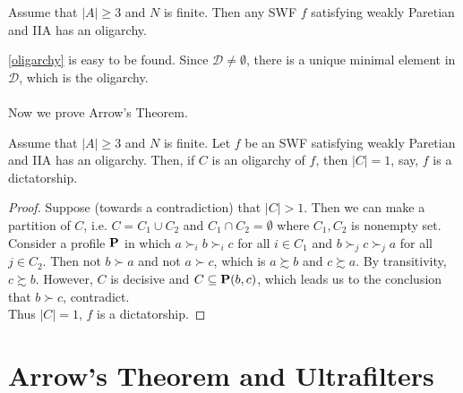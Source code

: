 \begin{theorem}
    \label{oligarchy}
    Assume that $|A| \geq 3$ and $N$ is finite. Then any SWF $f$ satisfying weakly Paretian and IIA has an oligarchy.
\end{theorem}

\cref{oligarchy} is easy to be found. Since $\mathcal{D} \neq \emptyset$, there is a unique minimal element in $\mathcal{D}$, which is the oligarchy. \\
~\\
Now we prove Arrow's Theorem.

\begin{lemma}
    Assume that $|A| \geq 3$ and $N$ is finite. Let $f$ be an SWF satisfying weakly Paretian and IIA has an oligarchy. Then, if $C$ is an oligarchy of $f$, then $|C| = 1$, say, $f$ is a dictatorship. 
\end{lemma}

\begin{proof}
    Suppose (towards a contradiction) that $|C| > 1$. Then we can make a partition of $C$, i.e. $C = C_1 \cup C_2$ and $C_1 \cap C_2 = \emptyset$ where $C_1,C_2$ is nonempty set.\\
    Consider a profile $\mathbf{P}$ in which $a \succ_i b \succ_i c$ for all $i \in C_1$ and $b \succ_j c \succ_j a$ for all $j \in C_2$. Then not $b \succ a$ and not $a \succ c$, which is $a \succsim b$ and $c \succsim a$. By transitivity, $c \succsim b$. However, $C$ is decisive and $C \subseteq \mathbf{P}(b,c)$, which leads us to the conclusion that $b \succ c$, contradict.\\
    Thus $|C| = 1$, $f$ is a dictatorship.
\end{proof}

\section{Arrow's Theorem and Ultrafilters}

